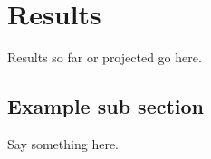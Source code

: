 \FloatBarrier
\section{Results} \label{sec:Results}
\FloatBarrier

Results so far or projected go here.

\subsection{Example sub section}
Say something here.
